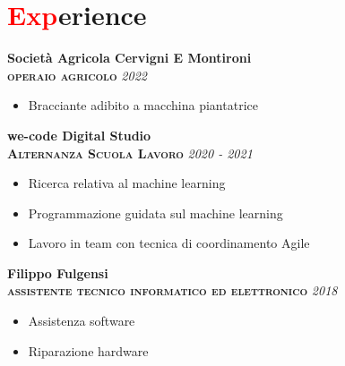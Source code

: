 \section*{\textcolor{red}{Exp}erience}
\large{\textbf{Società Agricola Cervigni E Montironi}}\\[3mm]
\textbf{\textsc{operaio agricolo}}\hfill
\textsl{2022}
\begin{itemize}
    \item Bracciante adibito a macchina piantatrice
\end{itemize}
\large{\textbf{we-code Digital Studio}}\\[3mm]
\textbf{\textsc{Alternanza Scuola Lavoro}}\hfill
\textsl{2020 - 2021}
\begin{itemize}
    \item Ricerca relativa al machine learning
    \item Programmazione guidata sul machine learning
    \item Lavoro in team con tecnica di coordinamento Agile
\end{itemize}
\large{\textbf{Filippo Fulgensi}}\\[3mm]
\textbf{\textsc{assistente tecnico informatico ed elettronico}}\hfill
\textsl{2018}
\begin{itemize}
    \item Assistenza software
    \item Riparazione hardware
\end{itemize}